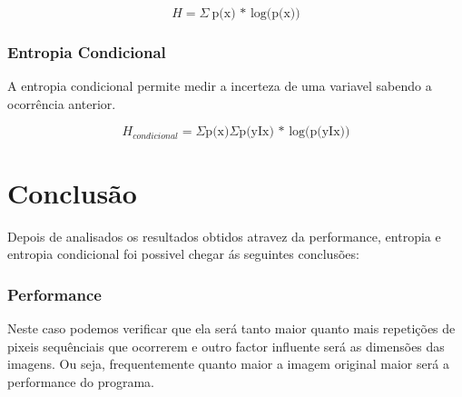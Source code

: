 \documentclass[12pt]{article}
\begin{document}
\begin{center}
\[ H = \Sigma\  \textrm{p(x) * log(p(x))}  \]
\end{center}


\printindex
\subsubsection{Entropia Condicional}
A entropia condicional permite medir a incerteza de uma variavel sabendo a ocorrência anterior.

\begin{center}
\[ H_{condicional} = \Sigma\textrm{p(x)} \Sigma\textrm{p(yIx) * log(p(yIx))}  \]
\end{center}

\newpage
{}

\printindex
\section{Conclusão}
Depois de analisados os resultados obtidos atravez da performance, entropia e entropia condicional foi possivel chegar ás seguintes conclusões:

\subsubsection{Performance}
Neste caso podemos verificar que ela será tanto maior quanto mais repetições de pixeis sequênciais que ocorrerem e outro factor influente será as dimensões das imagens. Ou seja, frequentemente quanto maior a imagem original maior será a performance do programa.
\end{document}
